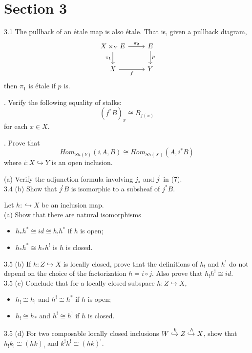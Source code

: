 \newpage
\section*{Section 3}
3.1 The pullback of an \'etale map is also \'etale. That is, given a pullback diagram, 
\[
\begin{tikzcd}
X \times_Y E \arrow[r, "\pi_2"] \arrow[d, "\pi_1"']
& E \arrow[d, "p"] \\
X \arrow[r, "f"']
& Y
\end{tikzcd}
\]
then $\pi_1$ is \'etale if $p$ is.

. Verify the following equality of stalks:
\[ (f^*B)_x \cong B_{f(x)}\]
for each $x \in X$. 

. Prove that 
\[ Hom_{Sh(Y)}(i_!A, B) \cong Hom_{Sh(X)}(A,i^*B)\]
where $i: X \hookrightarrow Y$ is an open inclusion.

 (a) Verify the adjunction formula involving $j_*$ and $j^!$ in (7).\\
3.4 (b) Show that $j^!B$ is isomorphic to a subsheaf of $j^*B$.

 Let $h: \hookrightarrow X$ be an inclusion map.\\ 
(a) Show that there are natural isomorphisms 
\begin{itemize}
	\item $h_*h^* \cong id \cong h_!h^*$ if $h$ is open;
	\item $h_*h^* \cong h_*h^!$ is $h$ is closed.
\end{itemize}
3.5 (b) If $h: Z \hookrightarrow X$ is locally closed, prove that the definitions of $h_!$ and $h^!$ do not depend on the choice of the factorization $h= i \circ j$. Also prove that $h_!h^! \cong id$.\\
3.5 (c) Conclude that for a locally closed subspace $h: Z \hookrightarrow X$, 
\begin{itemize}
	\item $h_! \cong h_!$ and $h^! \cong h^*$ if $h$ is open;
	\item $h_! \cong h_*$ and $h^! \cong h^!$ if $h$ is closed. 
\end{itemize}
3.5 (d) For two composable locally closed inclusions $W \xhookrightarrow{k} Z \xhookrightarrow{h} X$, show that $h_!k_! \cong (hk)_!$ and $k^!h^! \cong (hk)^!$.
